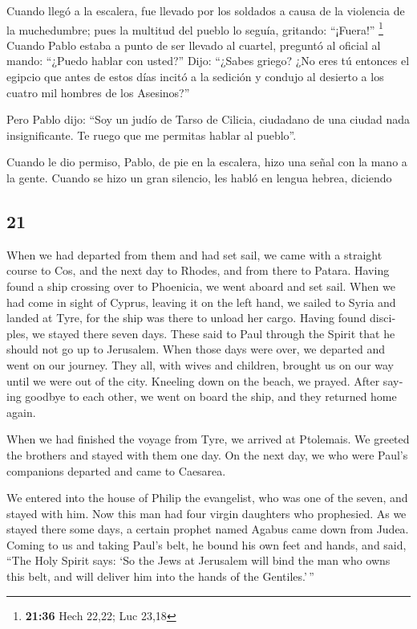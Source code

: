 \begin{paracol}{2}
 Cuando llegó a la escalera, fue llevado por los soldados
a causa de la violencia de la muchedumbre;  pues la
multitud del pueblo lo seguía, gritando: ``¡Fuera!'' \footnote{\textbf{21:36}
  Hech 22,22; Luc 23,18}  Cuando Pablo estaba a punto de
ser llevado al cuartel, preguntó al oficial al mando: ``¿Puedo hablar
con usted?'' Dijo: ``¿Sabes griego?  ¿No eres tú entonces
el egipcio que antes de estos días incitó a la sedición y condujo al
desierto a los cuatro mil hombres de los Asesinos?''

 Pero Pablo dijo: ``Soy un judío de Tarso de Cilicia,
ciudadano de una ciudad nada insignificante. Te ruego que me permitas
hablar al pueblo''.

 Cuando le dio permiso, Pablo, de pie en la escalera,
hizo una señal con la mano a la gente. Cuando se hizo un gran silencio,
les habló en lengua hebrea, diciendo

\switchcolumn
\begin{otherlanguage}{english}

\hypertarget{section-41}{%
\section{21}\label{section-41}}

 When we had departed from them and had set sail, we came
with a straight course to Cos, and the next day to Rhodes, and from
there to Patara.  Having found a ship crossing over to
Phoenicia, we went aboard and set sail.  When we had come
in sight of Cyprus, leaving it on the left hand, we sailed to Syria and
landed at Tyre, for the ship was there to unload her cargo.
 Having found disciples, we stayed there seven days. These
said to Paul through the Spirit that he should not go up to Jerusalem.
 When those days were over, we departed and went on our
journey. They all, with wives and children, brought us on our way until
we were out of the city. Kneeling down on the beach, we prayed.
 After saying goodbye to each other, we went on board the
ship, and they returned home again.

 When we had finished the voyage from Tyre, we arrived at
Ptolemais. We greeted the brothers and stayed with them one day.
 On the next day, we who were Paul's companions departed
and came to Caesarea.

We entered into the house of Philip the evangelist, who was one of the
seven, and stayed with him.  Now this man had four virgin
daughters who prophesied.  As we stayed there some days,
a certain prophet named Agabus came down from Judea. 
Coming to us and taking Paul's belt, he bound his own feet and hands,
and said, ``The Holy Spirit says: `So the Jews at Jerusalem will bind
the man who owns this belt, and will deliver him into the hands of the
Gentiles.'\,''


\end{otherlanguage}
\end{paracol}
